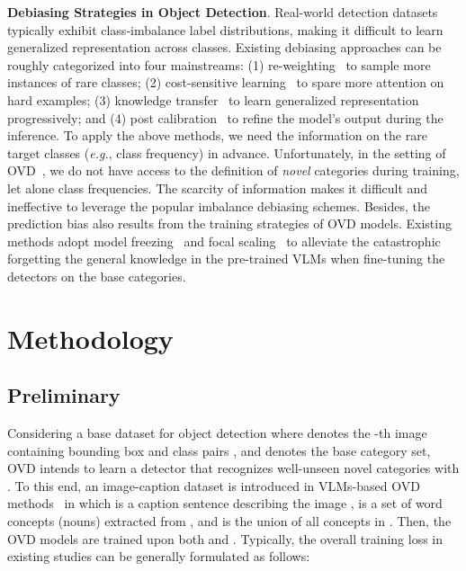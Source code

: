 \documentclass[10pt,twocolumn,letterpaper]{article}
\begin{document}
\textbf{Debiasing Strategies in Object Detection}.
Real-world detection datasets~\cite{coco_zeroshot,lvis,pan2020DRN} typically exhibit class-imbalance label distributions, making it difficult to learn generalized representation across classes.
Existing debiasing approaches can be roughly categorized into four mainstreams: (1) re-weighting~\cite{chang2021resampling,lvis,shen2016relay} to sample more instances of rare classes; 
(2) 
cost-sensitive learning~\cite{tan2020equalizationloss,tan2021equalizationlossv2,wang2021seesawloss} to spare more attention on hard examples;
(3) knowledge transfer~\cite{jamal2020rethinking,kang2019decoupling,liu2019large} to learn generalized representation progressively;
and (4) post calibration~\cite{li2020balancedgroupsoftmax,menon2020logitadjustment,pan2021norcal,tang2020causal} to refine the model's output during the inference. To apply the above methods, we need the information on the rare target classes (\emph{e.g.}, class frequency) in advance.
Unfortunately, 
in the setting of OVD~\cite{vild,ovrcnn}, we do not have access to the 
definition of \textit{novel} categories during training, let alone class frequencies. The scarcity of information makes it difficult and ineffective to leverage the popular imbalance debiasing schemes. Besides, the prediction bias also results from the training strategies of OVD models. Existing methods adopt model freezing~\cite{ovrcnn} and focal scaling~\cite{regionCLIP} to alleviate the 
catastrophic  
forgetting the general knowledge in the pre-trained VLMs when fine-tuning the detectors on the base categories.


%
 \section{Methodology}
\label{sec:Method}



\subsection{Preliminary}
\label{sec:Preliminary}

Considering a base dataset for object detection  where  denotes the -th image containing  bounding box and class pairs , and  denotes the base category set, OVD intends to learn a detector that recognizes well-unseen novel categories  with .
To this end, an image-caption dataset  is introduced in VLMs-based OVD methods~\cite{ovrcnn, detic,regionCLIP} in which  is a caption sentence describing the image ,  is a set of word concepts (nouns) extracted from , and  is the union of all concepts in .
Then, the OVD models are trained upon both  and . Typically, the overall training loss in existing studies can be generally formulated as follows:
\end{document}
